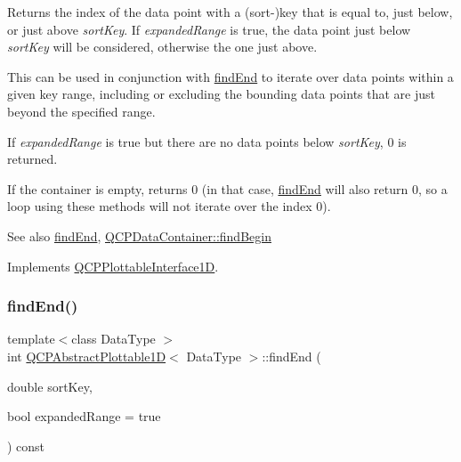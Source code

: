 Returns the index of the data point with a (sort-\/)key that is equal to, just below, or just above {\itshape sort\+Key}. If {\itshape expanded\+Range} is true, the data point just below {\itshape sort\+Key} will be considered, otherwise the one just above.

This can be used in conjunction with \hyperlink{class_q_c_p_abstract_plottable1_d_ad913df7f02add35150779dce3913aeae}{find\+End} to iterate over data points within a given key range, including or excluding the bounding data points that are just beyond the specified range.

If {\itshape expanded\+Range} is true but there are no data points below {\itshape sort\+Key}, 0 is returned.

If the container is empty, returns 0 (in that case, \hyperlink{class_q_c_p_abstract_plottable1_d_ad913df7f02add35150779dce3913aeae}{find\+End} will also return 0, so a loop using these methods will not iterate over the index 0).

\begin{DoxySeeAlso}{See also}
\hyperlink{class_q_c_p_abstract_plottable1_d_ad913df7f02add35150779dce3913aeae}{find\+End}, \hyperlink{class_q_c_p_data_container_a2ad8a5399072d99a242d3a6d2d7e278a}{Q\+C\+P\+Data\+Container\+::find\+Begin} 
\end{DoxySeeAlso}


Implements \hyperlink{class_q_c_p_plottable_interface1_d_a5b95783271306a4de97be54eac1e7d13}{Q\+C\+P\+Plottable\+Interface1D}.

\mbox{\label{class_q_c_p_abstract_plottable1_d_ad913df7f02add35150779dce3913aeae}} 
\subsubsection{\texorpdfstring{find\+End()}{findEnd()}}
{\footnotesize\ttfamily template$<$class Data\+Type $>$ \\
int \hyperlink{class_q_c_p_abstract_plottable1_d}{Q\+C\+P\+Abstract\+Plottable1D}$<$ Data\+Type $>$\+::find\+End (\begin{DoxyParamCaption}\item[{double}]{sort\+Key,  }\item[{bool}]{expanded\+Range = {\ttfamily true} }\end{DoxyParamCaption}) const\hspace{0.3cm}{\ttfamily [virtual]}}





